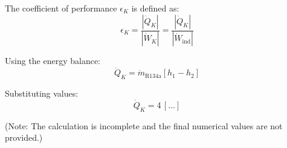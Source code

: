 The coefficient of performance \( \epsilon_K \) is defined as:  
\[
\epsilon_K = \frac{|\dot{Q}_K|}{|\dot{W}_K|} = \frac{|\dot{Q}_K|}{|\dot{W}_{\text{ind}}|}
\]  

Using the energy balance:  
\[
\dot{Q}_K = \dot{m}_{\text{R134a}} \left[ h_1 - h_2 \right]
\]  

Substituting values:  
\[
\dot{Q}_K = 4 \, \left[ \ldots \right]
\]  

(Note: The calculation is incomplete and the final numerical values are not provided.)